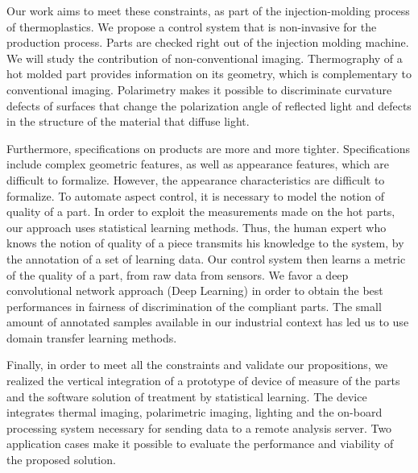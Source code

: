 Our work aims to meet these constraints, as part of the injection-molding process of thermoplastics.
We propose a control system that is non-invasive for the production process.
Parts are checked right out of the injection molding machine.
We will study the contribution of non-conventional imaging.
Thermography of a hot molded part provides information on its geometry, which is complementary to conventional imaging.
Polarimetry makes it possible to discriminate curvature defects of surfaces that change the polarization angle of reflected light and defects in the structure of the material that diffuse light.

Furthermore, specifications on products are more and more tighter.
Specifications include complex geometric features, as well as appearance features, which are difficult to formalize.
However, the appearance characteristics are difficult to formalize.
To automate aspect control, it is necessary to model the notion of quality of a part.
In order to exploit the measurements made on the hot parts, our approach uses statistical learning methods.
Thus, the human expert who knows the notion of quality of a piece transmits his knowledge to the system, by the annotation of a set of learning data.
Our control system then learns a metric of the quality of a part, from raw data from sensors.
We favor a deep convolutional network approach (Deep Learning) in order to obtain the best performances in fairness of discrimination of the compliant parts.
The small amount of annotated samples available in our industrial context has led us to use domain transfer learning methods.

Finally, in order to meet all the constraints and validate our propositions, we realized the vertical integration of a prototype of device of measure of the parts and the software solution of treatment by statistical learning.
The device integrates thermal imaging, polarimetric imaging, lighting and the on-board processing system necessary for sending data to a remote analysis server.
Two application cases make it possible to evaluate the performance and viability of the proposed solution.

